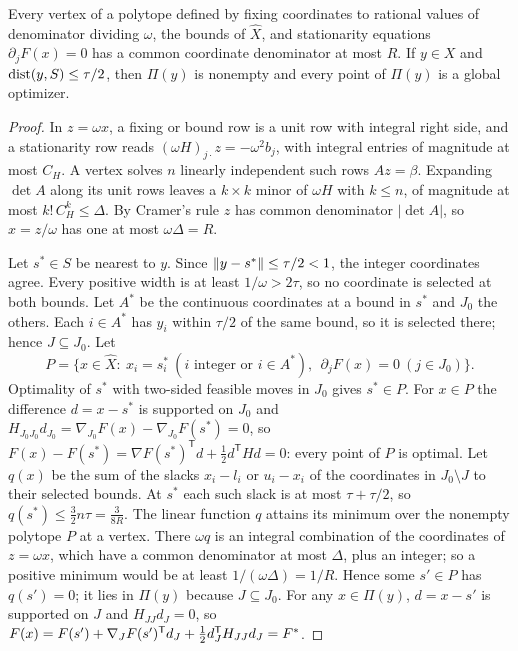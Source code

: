 \begin{lemma}\label{lem:recovery}
Every vertex of a polytope defined by fixing coordinates to rational values
of denominator dividing $\omega$, the bounds of $\hat X$, and stationarity
equations $\partial_jF(x)=0$ has a common coordinate denominator at most $R$.
If $y\in X$ and $\operatorname{dist}(y,S)\le\tau/2$, then $\Pi(y)$ is nonempty and every
point of $\Pi(y)$ is a global optimizer.
\end{lemma}

\begin{proof}
In $z=\omega x$, a fixing or bound row is a unit row with integral right side,
and a stationarity row reads $(\omega H)_{j\cdot}z=-\omega^2b_j$, with integral
entries of magnitude at most $C_H$. A vertex solves $n$ linearly independent
such rows $Az=\beta$. Expanding $\det A$ along its unit rows leaves a
$k\times k$ minor of $\omega H$ with $k\le n$, of magnitude at most
$k!\,C_H^k\le\Delta$. By Cramer's rule $z$ has common denominator $|\det A|$,
so $x=z/\omega$ has one at most $\omega\Delta=R$.

Let $s^*\in S$ be nearest to $y$. Since $\lVert y-s^*\rVert\le\tau/2<1$, the integer
coordinates agree. Every positive width is at least $1/\omega>2\tau$, so no
coordinate is selected at both bounds. Let $A^*$ be the continuous coordinates
at a bound in $s^*$ and $J_0$ the others. Each $i\in A^*$ has $y_i$ within
$\tau/2$ of the same bound, so it is selected there; hence $J\subseteq J_0$.
Let
\[
P=\{x\in\hat X:\ x_i=s^*_i\ (i\text{ integer or }i\in A^*),\ \ \partial_jF(x)=0\ (j\in J_0)\}.
\]
Optimality of $s^*$ with two-sided feasible moves in $J_0$ gives $s^*\in P$.
For $x\in P$ the difference $d=x-s^*$ is supported on $J_0$ and
$H_{J_0J_0}d_{J_0}=\nabla_{J_0}F(x)-\nabla_{J_0}F(s^*)=0$, so
$F(x)-F(s^*)=\nabla F(s^*)^{\mathsf T}d+\frac12d^{\mathsf T}Hd=0$: every point
of $P$ is optimal. Let $q(x)$ be the sum of the slacks $x_i-l_i$ or $u_i-x_i$
of the coordinates in $J_0\setminus J$ to their selected bounds. At $s^*$ each
such slack is at most $\tau+\tau/2$, so $q(s^*)\le\frac32n\tau=\frac3{8R}$. The
linear function $q$ attains its minimum over the nonempty polytope $P$ at a
vertex. There $\omega q$ is an integral combination of the coordinates of
$z=\omega x$, which have a common denominator at most $\Delta$, plus an
integer; so a positive minimum would be at least $1/(\omega\Delta)=1/R$. Hence some $s'\in P$ has $q(s')=0$; it lies in $\Pi(y)$ because
$J\subseteq J_0$. For any $x\in\Pi(y)$, $d=x-s'$ is supported on $J$ and
$H_{JJ}d_J=0$, so $F(x)=F(s')+\nabla_JF(s')^{\mathsf T}d_J+\frac12d_J^{\mathsf T}H_{JJ}d_J=F^*$.
\end{proof}

